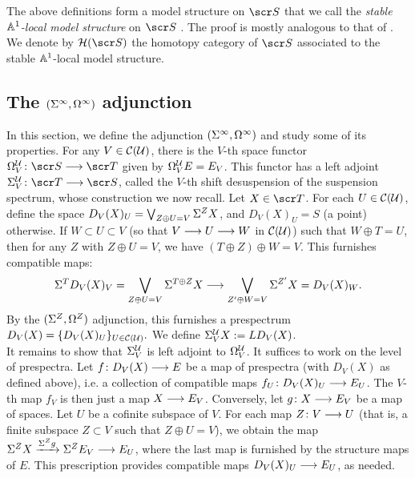 \documentclass{amsart}
\theoremstyle{definition}
\begin{document}
The above definitions form a model structure on $\sS$ that we call the \emph{stable $\mathbb{A}^1$-local model structure} on $\sS$ \cite[Theorem 6.4]{Hu03}. The proof is mostly analogous to that of \cite[Theorem 2.2.21]{MV99}. 
We denote by $\oH(\sS)$ the homotopy category of $\sS$ associated to the stable $\mathbb{A}^1$-local model structure.

\subsection{The $(\Sigma^{\infty},\Omega^{\infty})$ adjunction}\label{subsec:adjunction}
In this section, we define the adjunction $(\Sigma^{\infty},\Omega^{\infty})$ and study some of its properties. For any $V \in {\mathcal{C}}({\mathcal{U}})$, there is the $V$-th space functor $\OM^{\oU}_V \colon \sS \rtarr \sT$ given by $\Omega^{{\mathcal{U}}}_V E = E_V$. This functor has a left adjoint $\SI^{\oU}_V \colon \sT \rtarr \sS$, called the $V$-th shift desuspension of the suspension spectrum, whose construction we now recall. Let $X \in \sT$. For each $U \in {\mathcal{C}}({\mathcal{U}})$, define the space $D_V(X)_U = \bigvee_{Z \oplus U = V} \Sigma^Z X$, and $D_V(X)_U = S$ (a point) otherwise. If $W \subset U \subset V$ (so that $V \longrightarrow U \longrightarrow W$ in ${\mathcal{C}}({\mathcal{U}})$) such that $W \oplus T = U$, then for any $Z$ with $Z \oplus U = V$, we have $(T \oplus Z) \oplus W = V$. This furnishes compatible maps:
\[\Sigma^T D_V(X)_V = \bigvee_{Z \oplus U = V} \Sigma^{T \oplus Z} X \longrightarrow \bigvee_{Z' \oplus W = V} \Sigma^{Z'}X = D_V(X)_W.\]
By the $(\Sigma^Z, \Omega^Z)$ adjunction, this furnishes a prespectrum $D_V(X) = \{D_V(X)_U\}_{U \in {\mathcal{C}}({\mathcal{U}})}.$ We define $\Sigma^{{\mathcal{U}}}_V X := LD_V(X)$.\\

It remains to show that $\Sigma^{{\mathcal{U}}}_V$ is left adjoint to $\Omega^{{\mathcal{U}}}_V$. It suffices to work on the level of prespectra. Let $f \colon D_V(X) \longrightarrow E$ be a map of prespectra (with $D_V(X)$ as defined above), i.e. a collection of compatible maps $f_U \colon D_V(X)_U \longrightarrow E_U$. The $V$-th map $f_V$ is then just a map $X \longrightarrow E_V$. Conversely, let $g \colon X \longrightarrow E_V$ be a map of spaces. Let $U$ be a cofinite subspace of $V$. For each map $Z \colon V \longrightarrow U$ (that is, a finite subspace $Z \subset V$ such that $Z \oplus U = V$), we obtain the map $\Sigma^Z X \xrightarrow{\Sigma^Z g} \Sigma^Z E_V \longrightarrow E_U$, where the last map is furnished by the structure maps of $E$. This prescription provides compatible maps $D_V(X)_U \longrightarrow E_U$, as needed.\\
\end{document}
